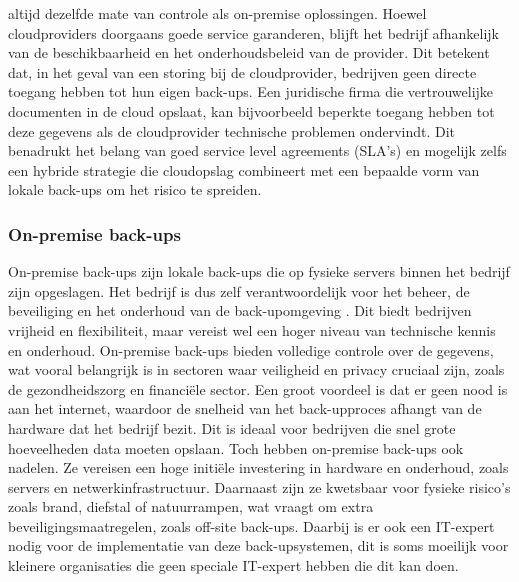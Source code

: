 altijd dezelfde mate van controle als on-premise oplossingen. Hoewel cloudproviders doorgaans goede service garanderen, blijft het bedrijf afhankelijk van de beschikbaarheid en het onderhoudsbeleid van de provider. Dit betekent dat, in het geval van een storing bij de cloudprovider, bedrijven geen directe toegang hebben tot hun eigen back-ups. Een juridische firma die vertrouwelijke documenten in de cloud opslaat, kan bijvoorbeeld beperkte toegang hebben tot deze gegevens als de cloudprovider technische problemen ondervindt. Dit benadrukt het belang van goed service level agreements (SLA's) en mogelijk zelfs een hybride strategie die cloudopslag combineert met een bepaalde vorm van lokale back-ups om het risico te spreiden.

\subsubsection{On-premise back-ups}
On-premise back-ups zijn lokale back-ups die op fysieke servers binnen het bedrijf zijn opgeslagen. Het bedrijf is dus zelf verantwoordelijk voor het beheer, de beveiliging en het onderhoud van de back-upomgeving \autocite{Trovato2019}. Dit biedt bedrijven vrijheid en flexibiliteit, maar vereist wel een hoger niveau van technische kennis en onderhoud. On-premise back-ups bieden volledige controle over de gegevens, wat vooral belangrijk is in sectoren waar veiligheid en privacy cruciaal zijn, zoals de gezondheidszorg en financiële sector. Een groot voordeel is dat er geen nood is aan het internet, waardoor de snelheid van het back-upproces afhangt van de hardware dat het bedrijf bezit. Dit is ideaal voor bedrijven die snel grote hoeveelheden data moeten opslaan. Toch hebben on-premise back-ups ook nadelen. Ze vereisen een hoge initiële investering in hardware en onderhoud, zoals servers en netwerkinfrastructuur. Daarnaast zijn ze kwetsbaar voor fysieke risico’s zoals brand, diefstal of natuurrampen, wat vraagt om extra beveiligingsmaatregelen, zoals off-site back-ups. Daarbij is er ook een IT-expert nodig voor de implementatie van deze back-upsystemen, dit is soms moeilijk voor kleinere organisaties die geen speciale IT-expert hebben die dit kan doen.

